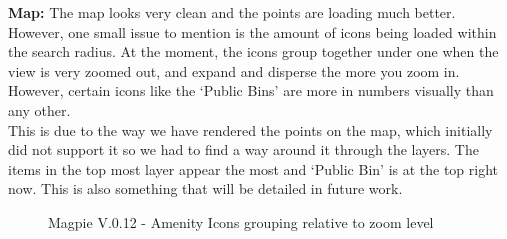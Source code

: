\newpage
\noindent\textbf{Map: }
The map looks very clean and the points are loading much better. However, one small issue to mention is the amount of icons being loaded within the search radius. At the moment, the icons group together under one when the view is very zoomed out, and expand and disperse the more you zoom in. However, certain icons like the `Public Bins' are more in numbers visually than any other.\\
This is due to the way we have rendered the points on the map, which initially did not support it so we had to find a way around it through the layers. The items in the top most layer appear the most and `Public Bin' is at the top right now. This is also something that will be detailed in future work.\\
\begin{figure}[h!]
    \centering
    \caption{Magpie V.0.12 - Amenity Icons grouping relative to zoom level}
\end{figure}

